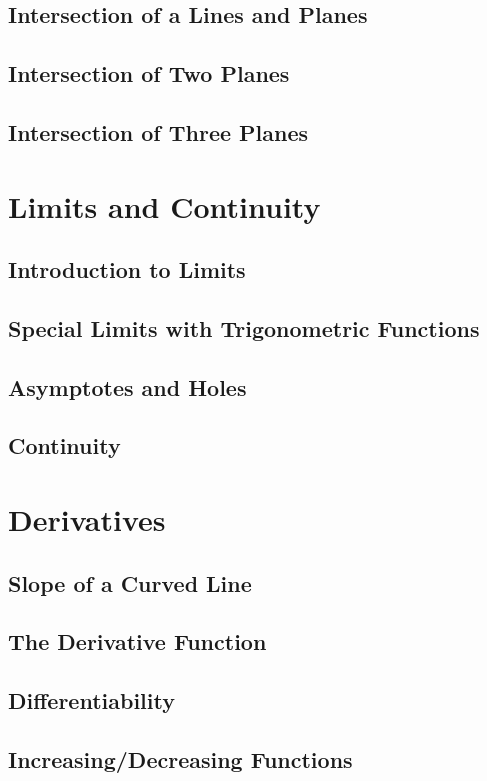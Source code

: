 \documentclass[14pt]{article}
\begin{document}
        \subsection{Intersection of a Lines and Planes}
        \subsection{Intersection of Two Planes}
        \subsection{Intersection of Three Planes}

    \section{Limits and Continuity}
        \subsection{Introduction to Limits}
        \subsection{Special Limits with Trigonometric Functions}
        \subsection{Asymptotes and Holes}
        \subsection{Continuity}

    \section{Derivatives}
        \subsection{Slope of a Curved Line}
        \subsection{The Derivative Function}
        \subsection{Differentiability}
        \subsection{Increasing/Decreasing Functions}
\end{document}
